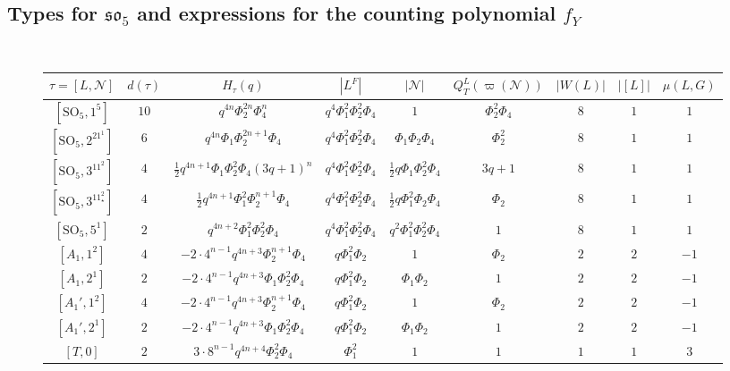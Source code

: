 \documentclass[12pt]{amsart}
\theoremstyle{plain}
\theoremstyle{definition}
\theoremstyle{remark}
\newcommand{\SO}{\mathrm{SO}}
\newcommand{\cN}{\mathcal{N}}
\begin{document}
\begin{landscape}
\subsection{Types for $\mathfrak{so}_5$ and expressions for the counting polynomial $f_Y$} 
\mbox{}\\

\begin{figure}[h]
\begin{tabular}{|c|cc|cccccc|} 
\hline
$\tau=[L,\cN]$ & ${d(\tau)}$ & $H_\tau(q)$ & $|L^F|$ & $|\cN|$ & $Q_T^L(\varpi(\cN))$ & $|W(L)|$ & $|[L]|$ & $\mu(L,G)$ \\
\hline
$[\SO_5,1^5]$ & ${10}$ & $q^{4n}\Phi_2^{2n}\Phi_4^n$ & $q^4\Phi_1^2\Phi_2^2\Phi_4$ & $1$ & $\Phi_2^2\Phi_4$ & $8$ & $1$ & $1$ \\
$[\SO_5,2^21^1]$ & ${6}$ & $q^{4n}\Phi_1\Phi_2^{2n+1}\Phi_4$ & $q^4\Phi_1^2\Phi_2^2\Phi_4$ & $\Phi_1\Phi_2\Phi_4$ & $\Phi_2^2$ & $8$ & $1$ & $1$ \\
$[\SO_5,3^11^2]$ & ${4}$ & $\frac{1}{2}q^{4n+1}\Phi_1\Phi_2^2\Phi_4(3q+1)^n$ & $q^4\Phi_1^2\Phi_2^2\Phi_4$ & $\frac{1}{2}q\Phi_1\Phi_2^2\Phi_4$ & $3q+1$ & $8$ & $1$ & $1$ \\
$[\SO_5,3^11^2_\star]$ & ${4}$ & $\frac{1}{2}q^{4n+1}\Phi_1^2\Phi_2^{n+1}\Phi_4$ & $q^4\Phi_1^2\Phi_2^2\Phi_4$ & $\frac{1}{2}q\Phi_1^2\Phi_2\Phi_4$ & $\Phi_2$ & $8$ & $1$ & $1$ \\
$[\SO_5,5^1]$ & ${2}$ & $q^{4n+2}\Phi_1^2\Phi_2^2\Phi_4$ & $q^4\Phi_1^2\Phi_2^2\Phi_4$ & $q^2\Phi_1^2\Phi_2^2\Phi_4$ & $1$ & $8$ & $1$ & $1$ \\
$[A_1,1^2]$ & ${4}$ & $-2\cdot 4^{n-1} q^{4n+3} \Phi_2^{n+1}\Phi_4$ & $q\Phi_1^2\Phi_2$ & $1$ & $\Phi_2$ & $2$ & $2$ & $-1$ \\
$[A_1,2^1]$ & ${2}$ & $-2\cdot 4^{n-1} q^{4n+3} \Phi_1\Phi_2^2\Phi_4$ & $q\Phi_1^2\Phi_2$ & $\Phi_1\Phi_2$ & $1$ & $2$ & $2$ & $-1$ \\
$[A_1',1^2]$ & ${4}$ & $-2\cdot 4^{n-1} q^{4n+3} \Phi_2^{n+1}\Phi_4$ & $q\Phi_1^2\Phi_2$ & $1$ & $\Phi_2$ & $2$ & $2$ & $-1$ \\
$[A_1',2^1]$ & ${2}$ & $-2\cdot 4^{n-1}q^{4n+3}\Phi_1\Phi_2^2\Phi_4$ & $q\Phi_1^2\Phi_2$ & $\Phi_1\Phi_2$ & $1$ & $2$ & $2$ & $-1$ \\
$[T,0]$ & ${2}$ & $3 \cdot 8^{n-1} q^{4n+4}\Phi_2^2\Phi_4$ & $\Phi_1^2$ & $1$ & $1$ & $1$ & $1$ & $3$ \\
\hline
\end{tabular}
\end{figure}



\end{landscape}
\end{document}
